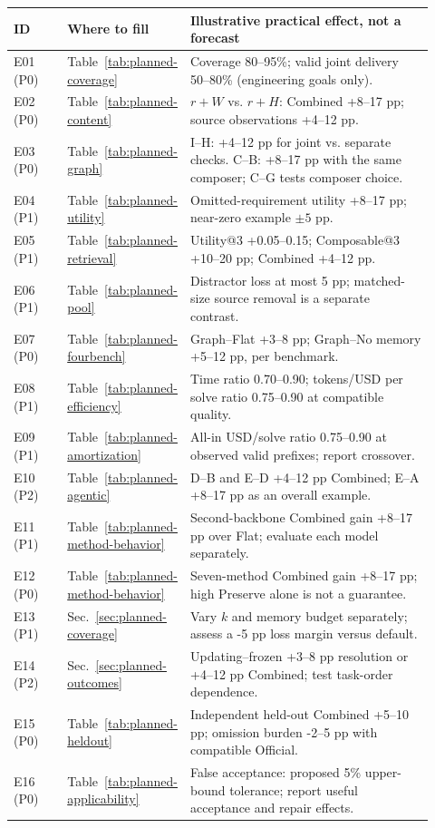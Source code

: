 {\small
\begin{tabular}{@{}p{0.13\linewidth}p{0.19\linewidth}p{0.60\linewidth}@{}}
\toprule
ID & Where to fill & Illustrative practical effect, not a forecast \\
\midrule
E01 (P0) & Table~\ref{tab:planned-coverage} & Coverage 80--95\%; valid joint delivery 50--80\% (engineering goals only). \\ [4pt]
E02 (P0) & Table~\ref{tab:planned-content} & $r+W$ vs. $r+H$: Combined +8--17 pp; source observations +4--12 pp. \\ [4pt]
E03 (P0) & Table~\ref{tab:planned-graph} & I--H: +4--12 pp for joint vs. separate checks. C--B: +8--17 pp with the same composer; C--G tests composer choice. \\ [4pt]
E04 (P1) & Table~\ref{tab:planned-utility} & Omitted-requirement utility +8--17 pp; near-zero example $\pm5$ pp. \\ [4pt]
E05 (P1) & Table~\ref{tab:planned-retrieval} & Utility@3 +0.05--0.15; Composable@3 +10--20 pp; Combined +4--12 pp. \\ [4pt]
E06 (P1) & Table~\ref{tab:planned-pool} & Distractor loss at most 5 pp; matched-size source removal is a separate contrast. \\ [4pt]
E07 (P0) & Table~\ref{tab:planned-fourbench} & Graph--Flat +3--8 pp; Graph--No memory +5--12 pp, per benchmark. \\ [4pt]
E08 (P1) & Table~\ref{tab:planned-efficiency} & Time ratio 0.70--0.90; tokens/USD per solve ratio 0.75--0.90 at compatible quality. \\ [4pt]
E09 (P1) & Table~\ref{tab:planned-amortization} & All-in USD/solve ratio 0.75--0.90 at observed valid prefixes; report crossover. \\ [4pt]
E10 (P2) & Table~\ref{tab:planned-agentic} & D--B and E--D +4--12 pp Combined; E--A +8--17 pp as an overall example. \\ [4pt]
E11 (P1) & Table~\ref{tab:planned-method-behavior} & Second-backbone Combined gain +8--17 pp over Flat; evaluate each model separately. \\ [4pt]
E12 (P0) & Table~\ref{tab:planned-method-behavior} & Seven-method Combined gain +8--17 pp; high Preserve alone is not a guarantee. \\ [4pt]
E13 (P1) & Sec.~\ref{sec:planned-coverage} & Vary $k$ and memory budget separately; assess a -5 pp loss margin versus default. \\ [4pt]
E14 (P2) & Sec.~\ref{sec:planned-outcomes} & Updating--frozen +3--8 pp resolution or +4--12 pp Combined; test task-order dependence. \\ [4pt]
E15 (P0) & Table~\ref{tab:planned-heldout} & Independent held-out Combined +5--10 pp; omission burden -2--5 pp with compatible Official. \\ [4pt]
E16 (P0) & Table~\ref{tab:planned-applicability} & False acceptance: proposed 5\% upper-bound tolerance; report useful acceptance and repair effects. \\ [4pt]
\bottomrule
\end{tabular}}

